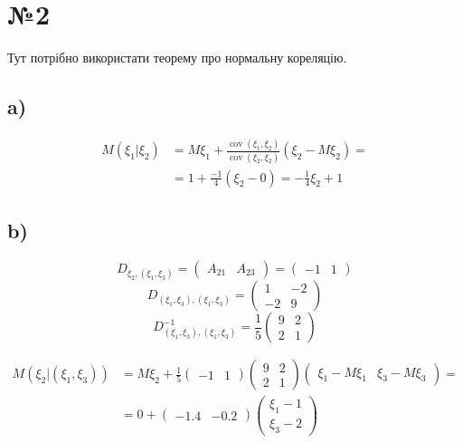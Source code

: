 \documentclass[11pt, a4paper]{article} %
\DeclareMathOperator{\cov}{cov}
\begin{document}
\section*{№2}

Тут потрібно використати теорему про нормальну кореляцію.
\subsection*{a)}

\begin{align*}
    M(\xi_1 | \xi_2) &= M\xi_1 + \frac{\cov(\xi_1, \xi_2)}{\cov(\xi_2, \xi_2)}(\xi_2 - M\xi_2) = \\
    &= 1 + \frac{-1}{4}(\xi_2 - 0) = -\frac{1}{4}\xi_2 + 1
\end{align*}

\subsection*{b)}

$$D_{\xi_2,(\xi_1,\xi_3)} = \begin{pmatrix}
    A_{21} & A_{23}
\end{pmatrix} = \begin{pmatrix}
    -1 & 1
\end{pmatrix}$$
$$D_{(\xi_1,\xi_3),(\xi_1,\xi_3)} = \begin{pmatrix}
    1 & -2 \\
    -2 & 9
\end{pmatrix}$$
$$D_{(\xi_1,\xi_3),(\xi_1,\xi_3)}^{-1} = \frac{1}{5} \begin{pmatrix}
    9 & 2 \\
    2 & 1
\end{pmatrix}$$

\begin{align*}
    M(\xi_2 | (\xi_1,\xi_3)) &= M\xi_2 + \frac{1}{5} \begin{pmatrix}
        -1 & 1
    \end{pmatrix} \begin{pmatrix}
        9 & 2 \\
        2 & 1
    \end{pmatrix} \begin{pmatrix}
        \xi_1 - M\xi_1 & \xi_3 - M\xi_3
    \end{pmatrix} = \\
    &= 0 + \begin{pmatrix}
        -1.4 & -0.2
    \end{pmatrix} \begin{pmatrix}
        \xi_1 - 1 \\
        \xi_3 - 2
    \end{pmatrix}
\end{align*}
\end{document}

